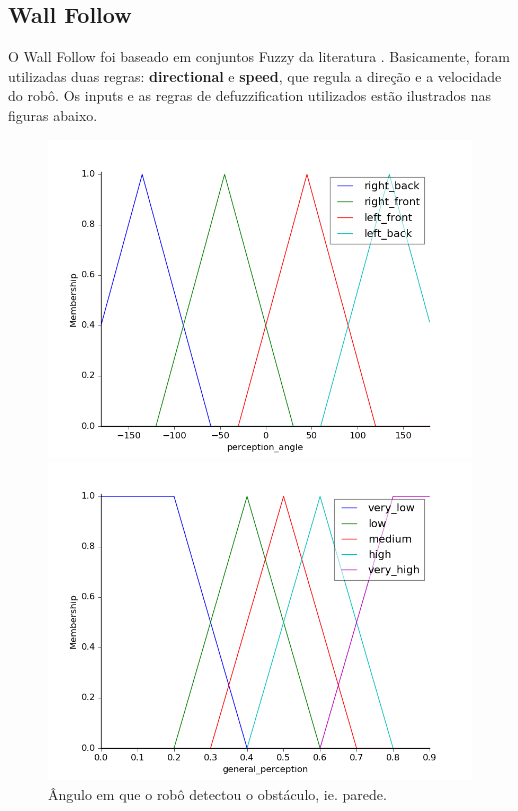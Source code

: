 \documentclass[twoside,conference,a4paper]{IEEEtran}
\begin{document}
\subsection{Wall Follow}

O Wall Follow foi baseado em conjuntos Fuzzy da literatura \cite{Reinhard:1995}. Basicamente, foram utilizadas duas regras: \textbf{directional} e \textbf{speed}, que regula a direção e a velocidade do robô. Os inputs e as regras de  defuzzification utilizados estão ilustrados nas figuras abaixo.

\begin{figure}[]
  \centering
  \includegraphics[width=1\hsize]{figuras/per_angle.png}
  \caption{Ângulo em que o robô detectou o obstáculo, ie. parede.}
  \label{fig:fig1}
  \includegraphics[width=1\hsize]{figuras/per.png}

\end{figure}
\end{document}
